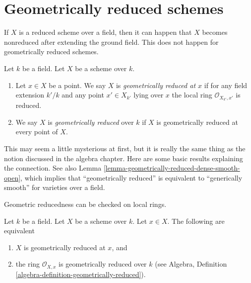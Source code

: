 \section{Geometrically reduced schemes}
\label{section-geometrically-reduced}

\noindent
If $X$ is a reduced scheme over a field, then it can happen that $X$
becomes nonreduced after extending the ground field. This does not happen
for geometrically reduced schemes.

\begin{definition}
\label{definition-geometrically-reduced}
Let $k$ be a field.
Let $X$ be a scheme over $k$.
\begin{enumerate}
\item Let $x \in X$ be a point.
We say $X$ is {\it geometrically reduced at $x$}
if for any field extension $k'/k$
and any point $x' \in X_{k'}$ lying over $x$
the local ring $\mathcal{O}_{X_{k'}, x'}$ is reduced.
\item We say $X$ is {\it geometrically reduced} over $k$
if $X$ is geometrically reduced at every point of $X$.
\end{enumerate}
\end{definition}

\noindent
This may seem a little mysterious at first, but it is
really the same thing as the notion discussed in the algebra chapter.
Here are some basic results explaining the connection.
See also Lemma \ref{lemma-geometrically-reduced-dense-smooth-open},
which implies that ``geometrically reduced'' is equivalent
to ``generically smooth'' for varieties over a field.

\begin{lemma}
\label{lemma-geometrically-reduced-at-point}
\begin{slogan}
Geometric reducedness can be checked on local rings.
\end{slogan}
Let $k$ be a field.
Let $X$ be a scheme over $k$.
Let $x \in X$.
The following are equivalent
\begin{enumerate}
\item $X$ is geometrically reduced at $x$, and
\item the ring $\mathcal{O}_{X, x}$ is geometrically
reduced over $k$ (see
Algebra, Definition \ref{algebra-definition-geometrically-reduced}).
\end{enumerate}
\end{lemma}

